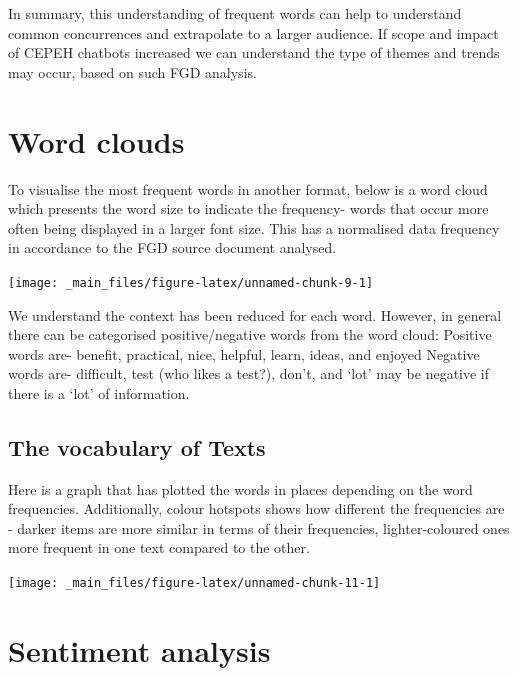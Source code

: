 \documentclass[a4paper, nobind]{templates/ociamthesis}
\begin{document}
In summary, this understanding of frequent words can help to understand
common concurrences and extrapolate to a larger audience. If scope and
impact of CEPEH chatbots increased we can understand the type of themes
and trends may occur, based on such FGD analysis.

\hypertarget{word-clouds}{%
\section{Word clouds}\label{word-clouds}}

To visualise the most frequent words in another format, below is a word
cloud which presents the word size to indicate the frequency- words that
occur more often being displayed in a larger font size. This has a
normalised data frequency in accordance to the FGD source document
analysed.

\begin{center}\texttt{[image: \_main\_files/figure-latex/unnamed-chunk-9-1]} \end{center}

We understand the context has been reduced for each word. However, in
general there can be categorised positive/negative words from the word
cloud: Positive words are- benefit, practical, nice, helpful, learn,
ideas, and enjoyed Negative words are- difficult, test (who likes a
test?), don't, and `lot' may be negative if there is a `lot' of
information.

\hypertarget{the-vocabulary-of-texts}{%
\subsection{The vocabulary of Texts}\label{the-vocabulary-of-texts}}

Here is a graph that has plotted the words in places depending on the
word frequencies. Additionally, colour hotspots shows how different the
frequencies are - darker items are more similar in terms of their
frequencies, lighter-coloured ones more frequent in one text compared to
the other.

\begin{flushleft}\texttt{[image: \_main\_files/figure-latex/unnamed-chunk-11-1]} \end{flushleft}

\hypertarget{sentiment-analysis}{%
\section{Sentiment analysis}\label{sentiment-analysis}}
\end{document}
